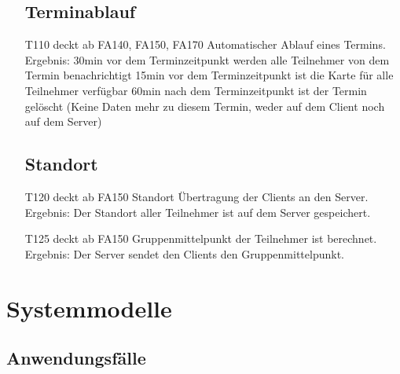 \documentclass{scrartcl}
\begin{document}
\begin{itemize}
	\subsection{Terminablauf}
	
		\item[T110] deckt ab FA140, FA150, FA170 \newline
		Automatischer Ablauf eines Termins. \newline
		Ergebnis: 30min vor dem Terminzeitpunkt werden alle \gls{Teilnehmer} von dem Termin benachrichtigt  \newline
			15min vor dem Terminzeitpunkt ist die Karte für alle Teilnehmer verfügbar  \newline
			60min nach dem Terminzeitpunkt ist der Termin gelöscht (Keine Daten mehr zu diesem Termin, weder auf 					dem \gls{Client} noch auf dem \gls{Server})

	\subsection{Standort}
		\item[T120] deckt ab FA150 \newline
		Standort Übertragung der Clients an den \gls{Server}.  \newline
		Ergebnis: Der Standort aller \gls{Teilnehmer} ist auf dem Server gespeichert.

		\item[T125]  deckt ab FA150 \newline
		Gruppenmittelpunkt der \gls{Teilnehmer} ist berechnet. \newline
		Ergebnis: Der \gls{Server} sendet den Clients den Gruppenmittelpunkt.

	\end{itemize}	
	
	\newpage
	
	
	\section{Systemmodelle}
	
	\subsection{Anwendungsfälle}
\end{document}
